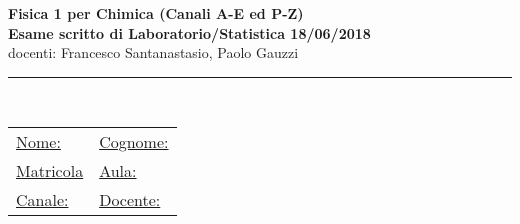 \documentclass[10pt,a4paper,fleqn]{article}
\begin{document}
\pagestyle{empty}

%
%
\newsavebox{\savepar}
\newenvironment{boxit}{\begin{lrbox}{\savepar}
\begin{minipage}[b]{16.0cm}}
{\end{minipage}\end{lrbox}\fbox{\usebox{\savepar}}}
\newcommand{\myblist}[1]{\begin{list}{#1}{\setlength{\topsep}{1.8mm}
\setlength{\parskip}{0mm} \setlength{\partopsep}{0mm} \setlength{\parsep}{0mm}
\setlength{\itemsep}{0mm}}}
\newcommand{\myhfill}[1]{\hfill {\it #1} = \underline{$~~~~~~~~~~~~~~~~~~~~~~~~~~~$}}
\newcommand{\myhfiyn}[0]{\hfill $\Box$~{\sc si}~~~~~~~~$\Box$~{\sc no}}
\newcommand{\myhfild}[2]
{\hfill {\it #1}= \underline{$~~~~~~~~~~$};~ {\it #2}= \underline{$~~~~~~~~~~$}}
\newcommand{\myhfilt}[3]
{\hfill {\it #1}= \underline{$~~~~~~~~~~~~~$};~ 
{\it #2}= \underline{$~~~~~~~~~~~~~$};~{\it #3}= \underline{$~~~~~~~~~~~~~$}}
%

\setlength{\unitlength}{1mm} 
\setlength{\headheight}{0mm} %

\newcommand{\s}{\text{s}}
\newcommand{\km}{\text{km}}
\newcommand{\kg}{\text{kg}}


\vspace*{-3.5cm}
\Large
{
\begin{center}
\vspace{0.1cm}
{\bf  Fisica 1 per Chimica (Canali A-E ed P-Z)} \\
{\bf Esame scritto di Laboratorio/Statistica 18/06/2018}   \\
docenti: Francesco Santanastasio, Paolo Gauzzi
   \\
\end{center}
\noindent\rule{18cm}{0.4pt}  \\
\normalsize
%
\begin{tabular}{ll}
{\underline{Nome:}}  \hspace{6cm} & {\underline{Cognome:}} \\[0.35cm]
{\underline {Matricola}} & {\underline {Aula:}}  \\[0.35cm]
{\underline {Canale:}} & {\underline {Docente:}}
\end{tabular}
\vspace{0.5cm}
}
\small
\end{document}
